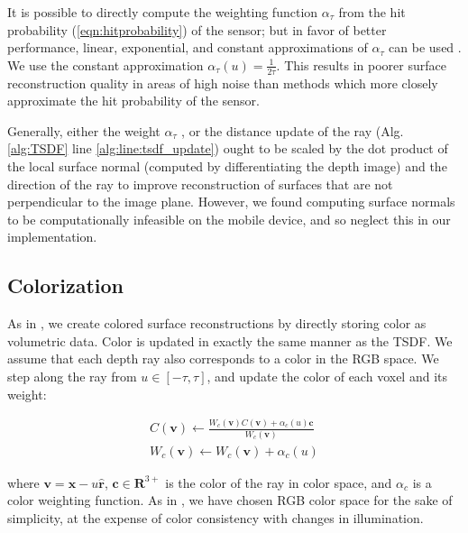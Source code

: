 \documentclass[conference]{IEEEtran}
\newcommand{\eref}[1]{(\ref{#1})}
\newcommand{\algoref}[1]{Alg.\ref{#1}}
\newcommand{\TSDF}{TSDF\xspace}
\begin{document}
 It is possible \cite{Nguyen2012} to directly compute the weighting function
 $\alpha_{\tau}$ from the hit probability \eref{eqn:hitprobability} of the
 sensor; but in favor of better performance, linear, exponential, and constant
 approximations of $\alpha_{\tau}$ can be used \cite{Curless1996, Newcombe,
 Whelan2013, Bylow2013}. We use the constant  approximation
 $\alpha_{\tau}(u) = \frac{1}{2 \tau}$. This results in poorer surface
 reconstruction quality in areas of high noise than methods which more closely
 approximate the hit probability of the sensor.

Generally, either the weight $\alpha_{\tau}$ \cite{Newcombe, Whelan2013}, or
the distance update of the ray (\algoref{alg:TSDF} line
\ref{alg:line:tsdf_update}) \cite{Curless1996, Bylow2013} ought to be scaled by
the dot product of the local surface normal (computed by differentiating the
depth image) and the direction of the ray to improve reconstruction of surfaces
that are not perpendicular to the image plane. However, we found computing
surface normals to be computationally infeasible on the mobile device, and so
neglect this in our implementation.

\subsection{Colorization}
\label{section:color}
As in \cite{Bylow2013, Whelan2013}, we create colored surface reconstructions by
directly storing color as volumetric data. Color is updated in exactly the same
manner as the \TSDF.  We assume that each depth ray also corresponds to a color
in the RGB space. We step along the ray from $u \in [-\tau, \tau]$, and update
the color of each voxel and its weight:

\begin{align}
C(\mathbf{v}) \gets \frac{W_c(\mathbf{v}) C(\mathbf{v}) +
\alpha_c(u) \mathbf{c}}{W_c(\mathbf{v})}
\\
%
W_c(\mathbf{v}) \gets W_c(\mathbf{v}) + \alpha_c(u)
\end{align}

\noindent where $\mathbf{v} = \mathbf{x} - u\mathbf{\hat{r}}$,  $\mathbf{c}
\in \mathbf{R}^{3+}$ is the color of the ray in color space, and $\alpha_c$ is a
color weighting function.  As in \cite{Bylow2013},
we have chosen RGB color space for the sake of simplicity, at the expense of
color consistency with changes in illumination.


\end{document}
